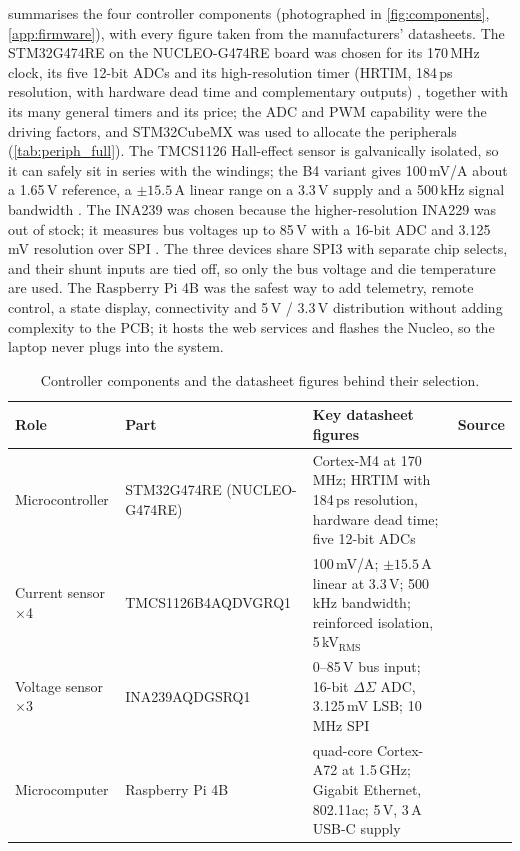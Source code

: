  summarises the four controller components (photographed in \cref{fig:components}, \cref{app:firmware}), with every figure taken from the manufacturers' datasheets. The STM32G474RE on the NUCLEO-G474RE board was chosen for its 170\,MHz clock, its five 12-bit ADCs and its high-resolution timer (HRTIM, 184\,ps resolution, with hardware dead time and complementary outputs) \cite{stm32g474_rm,mb1367_schematic}, together with its many general timers and its price; the ADC and PWM capability were the driving factors, and STM32CubeMX was used to allocate the peripherals (\cref{tab:periph_full}). The TMCS1126 Hall-effect sensor is galvanically isolated, so it can safely sit in series with the windings; the B4 variant gives 100\,mV/A about a 1.65\,V reference, a $\pm15.5$\,A linear range on a 3.3\,V supply and a 500\,kHz signal bandwidth \cite{tmcs1126_ds}. The INA239 was chosen because the higher-resolution INA229 was out of stock; it measures bus voltages up to 85\,V with a 16-bit ADC and 3.125\,mV resolution over SPI \cite{ina239_ds}. The three devices share SPI3 with separate chip selects, and their shunt inputs are tied off, so only the bus voltage and die temperature are used. The Raspberry Pi 4B \cite{rpi4_datasheet} was the safest way to add telemetry, remote control, a state display, connectivity and 5\,V / 3.3\,V distribution without adding complexity to the PCB; it hosts the web services and flashes the Nucleo, so the laptop never plugs into the system.

\begin{table}[htbp]\centering\small
\caption{Controller components and the datasheet figures behind their selection.}
\label{tab:components}
\begin{tabularx}{\linewidth}{l l X l}
\toprule
Role & Part & Key datasheet figures & Source\\
\midrule
Microcontroller & STM32G474RE (NUCLEO-G474RE) & Cortex-M4 at 170\,MHz; HRTIM with 184\,ps resolution, hardware dead time; five 12-bit ADCs & \cite{stm32g474_rm,mb1367_schematic}\\
Current sensor $\times$4 & TMCS1126B4AQDVGRQ1 & 100\,mV/A; $\pm15.5$\,A linear at 3.3\,V; 500\,kHz bandwidth; reinforced isolation, 5\,kV$_{\mathrm{RMS}}$ & \cite{tmcs1126_ds}\\
Voltage sensor $\times$3 & INA239AQDGSRQ1 & 0--85\,V bus input; 16-bit $\Delta\Sigma$ ADC, 3.125\,mV LSB; 10\,MHz SPI & \cite{ina239_ds}\\
Microcomputer & Raspberry Pi 4B & quad-core Cortex-A72 at 1.5\,GHz; Gigabit Ethernet, 802.11ac; 5\,V, 3\,A USB-C supply & \cite{rpi4_datasheet}\\
\bottomrule
\end{tabularx}
\end{table}

